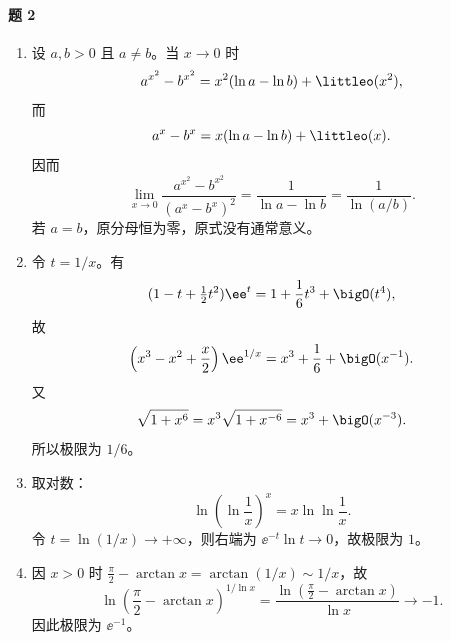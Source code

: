 \paragraph{题 2}
\begin{xsolution}
\begin{enumerate}[label=(\arabic*)]
  \item 设 $a,b>0$ 且 $a\ne b$。当 $x\to0$ 时
  \[
    a^{x^2}-b^{x^2}=x^2(\ln a-\ln b)+\littleo(x^2),
  \]
  而
  \[
    a^x-b^x=x(\ln a-\ln b)+\littleo(x).
  \]
  因而
  \[
    \lim_{x\to0}\frac{a^{x^2}-b^{x^2}}{(a^x-b^x)^2}
    =\frac1{\ln a-\ln b}=\frac1{\ln(a/b)}.
  \]
  若 $a=b$，原分母恒为零，原式没有通常意义。

  \item 令 $t=1/x$。有
  \[
    (1-t+\tfrac12t^2)\ee^t=1+\frac16t^3+\bigO(t^4),
  \]
  故
  \[
    \left(x^3-x^2+\frac x2\right)\ee^{1/x}
    =x^3+\frac16+\bigO(x^{-1}).
  \]
  又
  \[
    \sqrt{1+x^6}=x^3\sqrt{1+x^{-6}}=x^3+\bigO(x^{-3}).
  \]
  所以极限为 $1/6$。

  \item 取对数：
  \[
    \ln\left(\ln\frac1x\right)^x=x\ln\ln\frac1x.
  \]
  令 $t=\ln(1/x)\to+\infty$，则右端为 $\ee^{-t}\ln t\to0$，故极限为 $1$。

  \item 因 $x>0$ 时 $\frac\pi2-\arctan x=\arctan(1/x)\sim1/x$，故
  \[
    \ln\left(\frac\pi2-\arctan x\right)^{1/\ln x}
    =\frac{\ln(\frac\pi2-\arctan x)}{\ln x}\to-1.
  \]
  因此极限为 $\ee^{-1}$。
\end{enumerate}
\end{xsolution}


